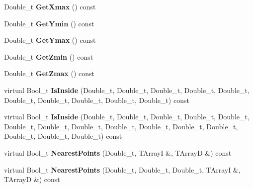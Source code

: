 \begin{DoxyCompactItemize}
\item 
\hypertarget{classTZigZag_a3984a5b137ba805dd84a97be16a2b5ce}{Double\-\_\-t {\bfseries Get\-Xmax} () const }\label{classTZigZag_a3984a5b137ba805dd84a97be16a2b5ce}

\item 
\hypertarget{classTZigZag_a49c16150565cea12ce1ff32ed8f6b16e}{Double\-\_\-t {\bfseries Get\-Ymin} () const }\label{classTZigZag_a49c16150565cea12ce1ff32ed8f6b16e}

\item 
\hypertarget{classTZigZag_a16a040ae25fb344c10eea98ffeece105}{Double\-\_\-t {\bfseries Get\-Ymax} () const }\label{classTZigZag_a16a040ae25fb344c10eea98ffeece105}

\item 
\hypertarget{classTZigZag_a698aee0422db09936cd9248abddf7708}{Double\-\_\-t {\bfseries Get\-Zmin} () const }\label{classTZigZag_a698aee0422db09936cd9248abddf7708}

\item 
\hypertarget{classTZigZag_a1dc64ff0182c707a4189e609caac1826}{Double\-\_\-t {\bfseries Get\-Zmax} () const }\label{classTZigZag_a1dc64ff0182c707a4189e609caac1826}

\item 
\hypertarget{classTZigZag_afef40bf3506d683433f0921fdaad28b7}{virtual Bool\-\_\-t {\bfseries Is\-Inside} (Double\-\_\-t, Double\-\_\-t, Double\-\_\-t, Double\-\_\-t, Double\-\_\-t, Double\-\_\-t, Double\-\_\-t, Double\-\_\-t, Double\-\_\-t, Double\-\_\-t) const }\label{classTZigZag_afef40bf3506d683433f0921fdaad28b7}

\item 
\hypertarget{classTZigZag_aa5c14c0cb56f63d8fac39ed1b8f65522}{virtual Bool\-\_\-t {\bfseries Is\-Inside} (Double\-\_\-t, Double\-\_\-t, Double\-\_\-t, Double\-\_\-t, Double\-\_\-t, Double\-\_\-t, Double\-\_\-t, Double\-\_\-t, Double\-\_\-t, Double\-\_\-t, Double\-\_\-t, Double\-\_\-t, Double\-\_\-t, Double\-\_\-t, Double\-\_\-t) const }\label{classTZigZag_aa5c14c0cb56f63d8fac39ed1b8f65522}

\item 
\hypertarget{classTZigZag_a49618e36a869bedefc27e6769b4d8629}{virtual Bool\-\_\-t {\bfseries Nearest\-Points} (Double\-\_\-t, T\-Array\-I \&, T\-Array\-D \&) const }\label{classTZigZag_a49618e36a869bedefc27e6769b4d8629}

\item 
\hypertarget{classTZigZag_a4ae5ae31190cff08e50edae2418817d8}{virtual Bool\-\_\-t {\bfseries Nearest\-Points} (Double\-\_\-t, Double\-\_\-t, Double\-\_\-t, T\-Array\-I \&, T\-Array\-D \&) const }\label{classTZigZag_a4ae5ae31190cff08e50edae2418817d8}


\end{DoxyCompactItemize}
